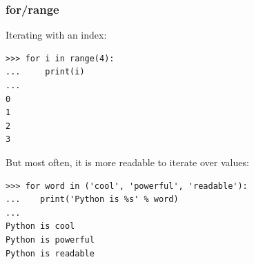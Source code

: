 \documentclass[colorlinks]{beamer}
\begin{document}
\begin{frame}[fragile]\frametitle{for/range}
  \begin{block}{Iterating with an index:}
\tiny
\begin{verbatim}
>>> for i in range(4):
...     print(i)
... 
0
1
2
3
\end{verbatim}

  \end{block}
\begin{block}{But most often, it is more readable to iterate over values:}
\tiny
\begin{verbatim}
>>> for word in ('cool', 'powerful', 'readable'):
...    print('Python is %s' % word)
... 
Python is cool
Python is powerful
Python is readable
\end{verbatim}

\end{block}
\end{frame}
\end{document}
